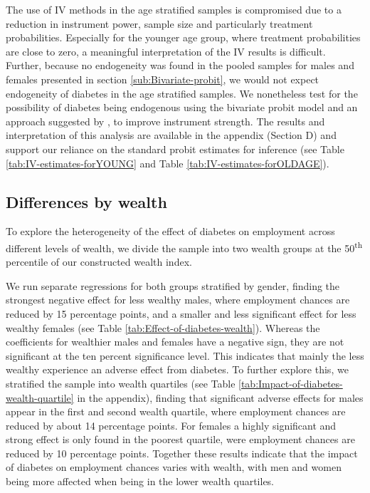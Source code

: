 The use of \ac{IV} methods in the age stratified samples
is compromised due to a reduction in instrument power, sample size
and particularly treatment probabilities. Especially for the younger
age group, where treatment probabilities are close to zero, a meaningful
interpretation of the \ac{IV} results is difficult. Further, because
no endogeneity was found in the pooled samples for males and females
presented in section \ref{sub:Bivariate-probit}, we would not expect
endogeneity of diabetes in the age stratified samples. We nonetheless
test for the possibility of diabetes being endogenous using the bivariate
probit model and an approach suggested by \textcite{Lewbel2012}, to
improve instrument strength. The results and interpretation of this
analysis are available in the appendix (Section D) and support our
reliance on the standard probit estimates for inference (see Table
\ref{tab:IV-estimates-forYOUNG} and Table \ref{tab:IV-estimates-forOLDAGE}).


\FloatBarrier

\subsection{Differences by wealth}

To explore the heterogeneity of the effect of diabetes on employment
across different levels of wealth, we divide the sample into two wealth
groups at the 50\textsuperscript{th} percentile of our constructed
wealth index.



We run separate regressions for both groups stratified by gender,
finding the strongest negative effect for less wealthy males, where
employment chances are reduced by 15 percentage points, and a smaller
and less significant effect for less wealthy females (see Table \ref{tab:Effect-of-diabetes-wealth}).
Whereas the coefficients for wealthier males and females have a negative
sign, they are not significant at the ten percent significance level.
This indicates that mainly the less wealthy experience an adverse
effect from diabetes. To further explore this, we stratified the sample
into wealth quartiles (see Table \ref{tab:Impact-of-diabetes-wealth-quartile}
in the appendix), finding that significant adverse effects for males
appear in the first and second wealth quartile, where employment chances
are reduced by about 14 percentage points. For females a highly significant
and strong effect is only found in the poorest quartile, were employment
chances are reduced by 10 percentage points. Together these results
indicate that the impact of diabetes on employment chances varies
with wealth, with men and women being more affected when being in
the lower wealth quartiles.

